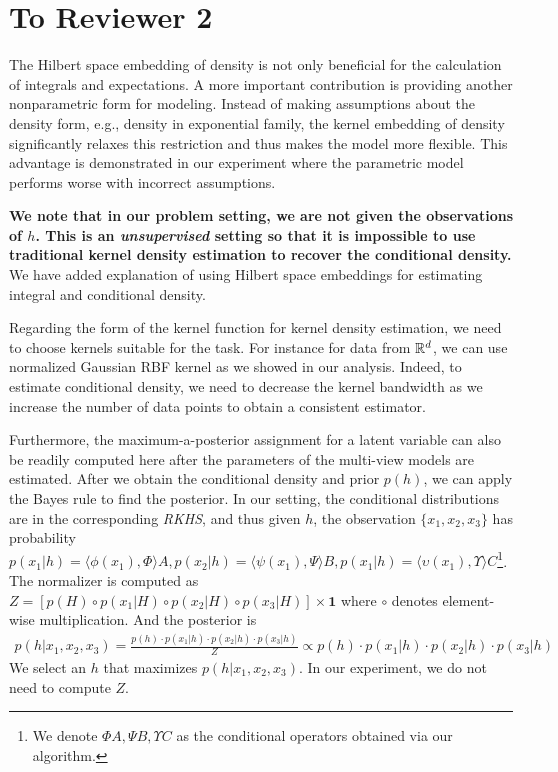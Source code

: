 \documentclass{article}
\newcommand{\bodai}[1]{{\color{violet}{\bf\sf [Dai remark: #1]}}}
\begin{document}
\section*{To Reviewer 2}

The Hilbert space embedding of density is not only beneficial for the calculation of integrals and expectations. A more important contribution is providing another nonparametric form for modeling. Instead of making assumptions about the density form, e.g., density in exponential family, the kernel embedding of density significantly relaxes this restriction and thus makes the model more flexible. This advantage is demonstrated in our experiment where the parametric model performs worse with incorrect assumptions.


{\bf We note that in our problem setting, we are not given the observations of $h$. This is an \emph{unsupervised} setting so that it is impossible to use traditional kernel density estimation to recover the conditional density.} We have added explanation of using Hilbert space embeddings for estimating integral and conditional density.

Regarding the form of the kernel function for kernel density estimation, we need to choose kernels suitable for the task. For instance for data from $\mathbb{R}^d$, we can use normalized Gaussian RBF kernel as we showed in our analysis. Indeed, to estimate conditional density, we need to decrease the kernel bandwidth as we increase the number of data points to obtain a consistent estimator.


Furthermore, the maximum-a-posterior assignment for a latent variable can also be readily computed here after the parameters of the multi-view models are estimated. After we obtain the conditional density and prior $p(h)$, we can apply the Bayes rule to find the posterior. In our setting, the conditional distributions are in the corresponding \emph{RKHS}, and thus given $h$, the observation $\{x_1,x_2,x_3\}$ has probability $p(x_1|h) = \langle\phi(x_1), \Phi \rangle A, p(x_2|h) = \langle\psi(x_1), \Psi \rangle B, p(x_1|h) = \langle\upsilon(x_1), \Upsilon \rangle C$\footnote{We denote $\Phi A, \Psi B, \Upsilon C$ as the conditional operators obtained via our algorithm.}.
The normalizer is computed as $Z = [p(H)\circ p(x_1|H)\circ p(x_2|H)\circ p(x_3|H)] \times \bm{1}$ where $\circ$ denotes element-wise multiplication. And the posterior is
%
\begin{eqnarray*}
p(h|x_1, x_2, x_3) = \frac{p(h)\cdot p(x_1|h)\cdot p(x_2|h)\cdot p(x_3|h)}{Z} \propto p(h)\cdot p(x_1|h)\cdot p(x_2|h)\cdot p(x_3|h)
\end{eqnarray*}
%
We select an $h$ that maximizes $p(h|x_1, x_2, x_3)$. In our experiment, we do not need to compute $Z$.
\end{document}
